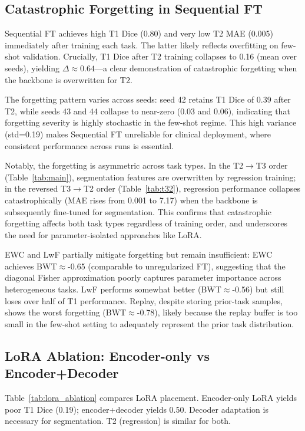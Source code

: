 \documentclass[journal,twoside,web]{ieeecolor}
\begin{document}
\subsection{Catastrophic Forgetting in Sequential FT}
\label{sec:forgetting}

Sequential FT achieves high T1 Dice (0.80) and very low T2 MAE (0.005) immediately after training each task. The latter likely reflects overfitting on few-shot validation. Crucially, T1 Dice after T2 training collapses to 0.16 (mean over seeds), yielding $\Delta \approx 0.64$---a clear demonstration of catastrophic forgetting when the backbone is overwritten for T2.

The forgetting pattern varies across seeds: seed 42 retains T1 Dice of 0.39 after T2, while seeds 43 and 44 collapse to near-zero (0.03 and 0.06), indicating that forgetting severity is highly stochastic in the few-shot regime. This high variance (std=0.19) makes Sequential FT unreliable for clinical deployment, where consistent performance across runs is essential.

Notably, the forgetting is asymmetric across task types. In the T2$\to$T3 order (Table~\ref{tab:main}), segmentation features are overwritten by regression training; in the reversed T3$\to$T2 order (Table~\ref{tab:t32}), regression performance collapses catastrophically (MAE rises from 0.001 to 7.17) when the backbone is subsequently fine-tuned for segmentation. This confirms that catastrophic forgetting affects both task types regardless of training order, and underscores the need for parameter-isolated approaches like LoRA.

EWC and LwF partially mitigate forgetting but remain insufficient: EWC achieves BWT$\approx$-0.65 (comparable to unregularized FT), suggesting that the diagonal Fisher approximation poorly captures parameter importance across heterogeneous tasks. LwF performs somewhat better (BWT$\approx$-0.56) but still loses over half of T1 performance. Replay, despite storing prior-task samples, shows the worst forgetting (BWT$\approx$-0.78), likely because the replay buffer is too small in the few-shot setting to adequately represent the prior task distribution.

\subsection{LoRA Ablation: Encoder-only vs Encoder+Decoder}
\label{sec:lora_ablation}

Table~\ref{tab:lora_ablation} compares LoRA placement. Encoder-only LoRA yields poor T1 Dice (0.19); encoder+decoder yields 0.50. Decoder adaptation is necessary for segmentation. T2 (regression) is similar for both.
\end{document}
